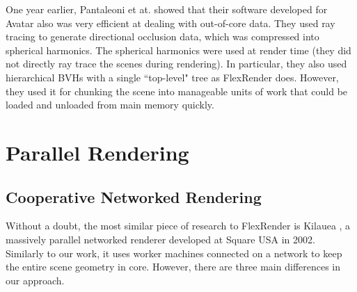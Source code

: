 \documentclass[12pt]{ucthesis}
\begin{document}
One year earlier, Pantaleoni et at. \cite{pantaleoni:2010} showed that their
software developed for Avatar also was very efficient at dealing with out-of-core
data. They used ray tracing to generate directional occlusion data, which was
compressed into spherical harmonics. The spherical harmonics were used at render
time (they did not directly ray trace the scenes during rendering). In particular,
they also used hierarchical BVHs with a single ``top-level" tree as FlexRender
does. However, they used it for chunking the scene into manageable units of work
that could be loaded and unloaded from main memory quickly.

\section{Parallel Rendering}
\label{parallelbg}

\subsection{Cooperative Networked Rendering}
\label{networked}

Without a doubt, the most similar piece of research to FlexRender is Kilauea
\cite{kato:2002}, a massively parallel networked renderer developed at Square
USA in 2002. Similarly to our work, it uses worker machines connected on a
network to keep the entire scene geometry in core. However, there are three
main differences in our approach.
\end{document}
